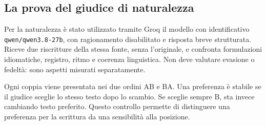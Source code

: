 \documentclass[11pt,a4paper]{article}
\begin{document}
\subsection{La prova del giudice di naturalezza}\label{la-prova-del-giudice-di-naturalezza}

Per la naturalezza è stato utilizzato tramite Groq il modello con identificativo \nolinkurl{qwen/qwen3.8-27b}, con ragionamento disabilitato e risposta breve strutturata. Riceve due riscritture della stessa fonte, senza l'originale, e confronta formulazioni idiomatiche, registro, ritmo e coerenza linguistica. Non deve valutare evasione o fedeltà: sono aspetti misurati separatamente.

Ogni coppia viene presentata nei due ordini AB e BA. Una preferenza è stabile se il giudice sceglie lo stesso testo dopo lo scambio. Se sceglie sempre B, sta invece cambiando testo preferito. Questo controllo permette di distinguere una preferenza per la scrittura da una sensibilità alla posizione.
\end{document}
